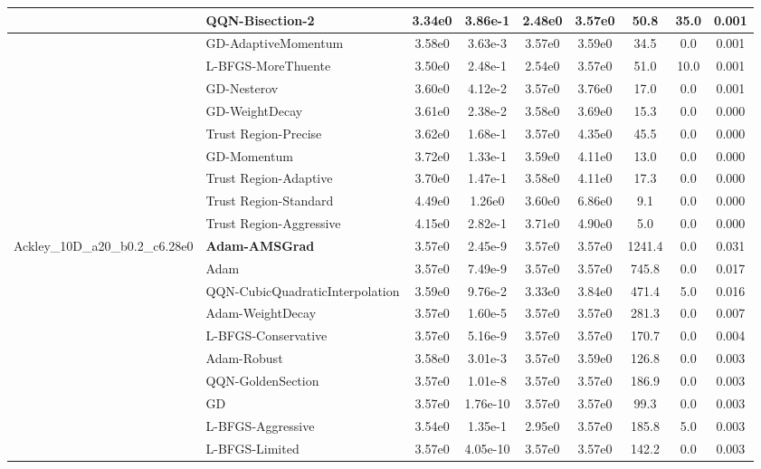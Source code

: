\documentclass{article}
\begin{document}
\begin{longtable}{|l|l|c|c|c|c|c|c|c|}
 & QQN-Bisection-2 & 3.34e0 & 3.86e-1 & 2.48e0 & 3.57e0 & 50.8 & 35.0 & 0.001 \\
\hline
 & GD-AdaptiveMomentum & 3.58e0 & 3.63e-3 & 3.57e0 & 3.59e0 & 34.5 & 0.0 & 0.001 \\
\hline
 & L-BFGS-MoreThuente & 3.50e0 & 2.48e-1 & 2.54e0 & 3.57e0 & 51.0 & 10.0 & 0.001 \\
\hline
 & GD-Nesterov & 3.60e0 & 4.12e-2 & 3.57e0 & 3.76e0 & 17.0 & 0.0 & 0.001 \\
\hline
 & GD-WeightDecay & 3.61e0 & 2.38e-2 & 3.58e0 & 3.69e0 & 15.3 & 0.0 & 0.000 \\
\hline
 & Trust Region-Precise & 3.62e0 & 1.68e-1 & 3.57e0 & 4.35e0 & 45.5 & 0.0 & 0.000 \\
\hline
 & GD-Momentum & 3.72e0 & 1.33e-1 & 3.59e0 & 4.11e0 & 13.0 & 0.0 & 0.000 \\
\hline
 & Trust Region-Adaptive & 3.70e0 & 1.47e-1 & 3.58e0 & 4.11e0 & 17.3 & 0.0 & 0.000 \\
\hline
 & Trust Region-Standard & 4.49e0 & 1.26e0 & 3.60e0 & 6.86e0 & 9.1 & 0.0 & 0.000 \\
\hline
 & Trust Region-Aggressive & 4.15e0 & 2.82e-1 & 3.71e0 & 4.90e0 & 5.0 & 0.0 & 0.000 \\
Ackley\_10D\_a20\_b0.2\_c6.28e0 & \textbf{Adam-AMSGrad} & 3.57e0 & 2.45e-9 & 3.57e0 & 3.57e0 & 1241.4 & 0.0 & 0.031 \\
\hline
 & Adam & 3.57e0 & 7.49e-9 & 3.57e0 & 3.57e0 & 745.8 & 0.0 & 0.017 \\
\hline
 & QQN-CubicQuadraticInterpolation & 3.59e0 & 9.76e-2 & 3.33e0 & 3.84e0 & 471.4 & 5.0 & 0.016 \\
\hline
 & Adam-WeightDecay & 3.57e0 & 1.60e-5 & 3.57e0 & 3.57e0 & 281.3 & 0.0 & 0.007 \\
\hline
 & L-BFGS-Conservative & 3.57e0 & 5.16e-9 & 3.57e0 & 3.57e0 & 170.7 & 0.0 & 0.004 \\
\hline
 & Adam-Robust & 3.58e0 & 3.01e-3 & 3.57e0 & 3.59e0 & 126.8 & 0.0 & 0.003 \\
\hline
 & QQN-GoldenSection & 3.57e0 & 1.01e-8 & 3.57e0 & 3.57e0 & 186.9 & 0.0 & 0.003 \\
\hline
 & GD & 3.57e0 & 1.76e-10 & 3.57e0 & 3.57e0 & 99.3 & 0.0 & 0.003 \\
\hline
 & L-BFGS-Aggressive & 3.54e0 & 1.35e-1 & 2.95e0 & 3.57e0 & 185.8 & 5.0 & 0.003 \\
\hline
 & L-BFGS-Limited & 3.57e0 & 4.05e-10 & 3.57e0 & 3.57e0 & 142.2 & 0.0 & 0.003 \\
\hline

\end{longtable}
\end{document}
